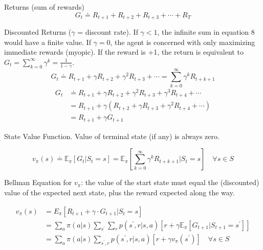 \documentclass{article}
\begin{document}
\noindent
Returns (sum of rewards)
\begin{equation}
G_{t} \doteq R_{t+1}+R_{t+2}+R_{t+3}+\cdots+R_{T}
\end{equation}

\noindent
Discounted Returns ($\gamma$ = discount rate). If $\gamma < 1$, the infinite sum
in equation 8 would have a finite value. If $\gamma = 0$, the agent is concerned
with only maximizing immediate rewards (myopic). If the reward is +1, the return
is equivalent to $G_{t}=\sum_{k=0}^{\infty} \gamma^{k}=\frac{1}{1-\gamma}$.
\begin{equation}
G_{t} \doteq R_{t+1}+\gamma R_{t+2}+\gamma^{2} R_{t+3}+\cdots=\sum_{k=0}^{\infty} \gamma^{k} R_{t+k+1}
\end{equation}
\begin{equation}
\begin{aligned}
G_{t} & \doteq R_{t+1}+\gamma R_{t+2}+\gamma^{2} R_{t+3}+\gamma^{3} R_{t+4}+\cdots \\
&=R_{t+1}+\gamma\left(R_{t+2}+\gamma R_{t+3}+\gamma^{2} R_{t+4}+\cdots\right) \\
&=R_{t+1}+\gamma G_{t+1}
\end{aligned}
\end{equation}

\noindent
State Value Function. Value of terminal state (if any) is always zero.

\begin{equation}
v_{\pi}(s) \doteq \mathbb{E}_{\pi}[G_{t} | S_{t}=s]=\mathbb{E}_{\pi}[\sum_{k=0}^{\infty} \gamma^{k} R_{t+k+1} | S_{t}=s] \quad \forall s \in S
\end{equation}

\noindent
Bellman Equation for $v_{\pi}$: the value of the start state must equal the
(discounted) value of the expected next state, plus the reward expected along
the way.

\begin{equation}
\begin{aligned}
v_{\pi}(s) &= E_{\pi}[R_{t+1}+\gamma \cdot G_{t+1} | S_{t}=s] \\
&= \sum_{a} \pi(a | s) \sum_{s^{\prime}} \sum_{r} p(s^{\prime}, r|s, a)[r+\gamma \mathbb{E}_{\pi}[G_{t+1} | S_{t+1}=s^{\prime}]]\\
&=\sum_{a} \pi(a | s) \sum_{s^{\prime}, r} p\left(s^{\prime}, r | s, a\right)\left[r+\gamma v_{\pi}\left(s^{\prime}\right)\right] \quad \forall s \in S
\end{aligned}
\end{equation}
\end{document}
